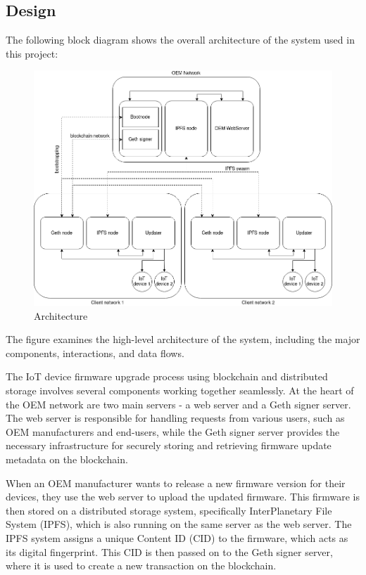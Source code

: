 \documentclass{article}
\begin{document}
\subsection{Design}
The following block diagram shows the overall architecture of the system used in this project:

\begin{figure}[H]
    \centering
    \includegraphics[width=\textwidth]{architecture.png}
    \caption{Architecture}
\end{figure}


The figure examines the high-level architecture of the system, including the major components, interactions, and data flows.

The IoT device firmware upgrade process using blockchain and distributed storage involves several components working together seamlessly. At the heart of the OEM network are two main servers - a web server and a Geth signer server. The web server is responsible for handling requests from various users, such as OEM manufacturers and end-users, while the Geth signer server provides the necessary infrastructure for securely storing and retrieving firmware update metadata on the blockchain.

When an OEM manufacturer wants to release a new firmware version for their devices, they use the web server to upload the updated firmware. This firmware is then stored on a distributed storage system, specifically InterPlanetary File System (IPFS), which is also running on the same server as the web server. The IPFS system assigns a unique Content ID (CID) to the firmware, which acts as its digital fingerprint. This CID is then passed on to the Geth signer server, where it is used to create a new transaction on the blockchain.
\end{document}
